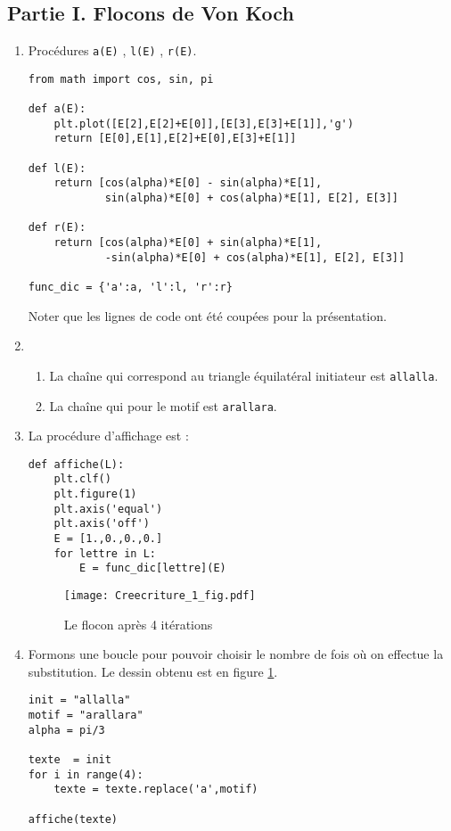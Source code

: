 \subsection*{Partie I. Flocons de Von Koch}
\begin{enumerate}
 \item Procédures \verb|a(E)| , \verb|l(E)| , \verb|r(E)|.
\begin{verbatim}
from math import cos, sin, pi

def a(E):
    plt.plot([E[2],E[2]+E[0]],[E[3],E[3]+E[1]],'g')
    return [E[0],E[1],E[2]+E[0],E[3]+E[1]]
    
def l(E):
    return [cos(alpha)*E[0] - sin(alpha)*E[1], 
            sin(alpha)*E[0] + cos(alpha)*E[1], E[2], E[3]]

def r(E):
    return [cos(alpha)*E[0] + sin(alpha)*E[1],
            -sin(alpha)*E[0] + cos(alpha)*E[1], E[2], E[3]]
    
func_dic = {'a':a, 'l':l, 'r':r}
\end{verbatim}
Noter que les lignes de code ont été coupées pour la présentation.
\item \begin{enumerate}
 \item La chaîne qui correspond au triangle équilatéral initiateur est \verb|allalla|.
\item La chaîne qui pour le motif est \verb|arallara|.
\end{enumerate}

\item La procédure d'affichage est :
\begin{verbatim}
def affiche(L):
    plt.clf()
    plt.figure(1)
    plt.axis('equal')
    plt.axis('off')
    E = [1.,0.,0.,0.]
    for lettre in L:
        E = func_dic[lettre](E)
\end{verbatim}

\begin{figure}
 \centering
 \texttt{[image: Creecriture\_1\_fig.pdf]}
 \caption{Le flocon après 4 itérations}
 \label{fig:Creecriture_1}
\end{figure}

\item Formons une boucle pour pouvoir choisir le nombre de fois où on effectue la substitution. Le dessin obtenu est en figure \ref{fig:Creecriture_1}.
\begin{verbatim}
init = "allalla"
motif = "arallara"
alpha = pi/3

texte  = init
for i in range(4):
    texte = texte.replace('a',motif)

affiche(texte)
\end{verbatim}

\end{enumerate}

